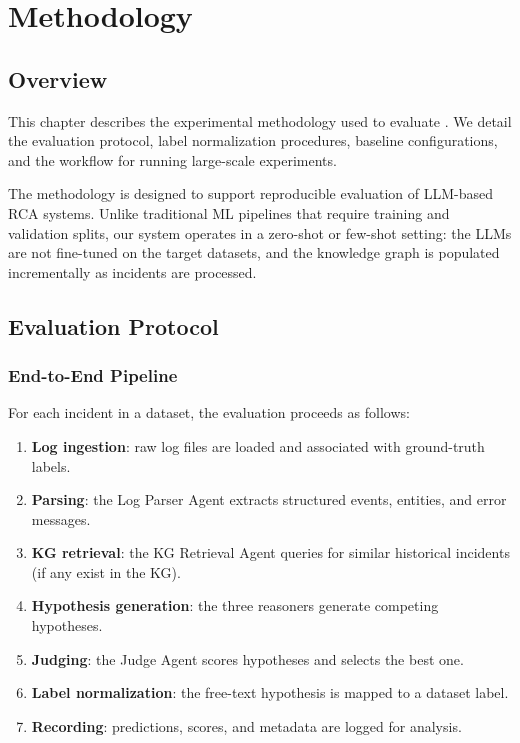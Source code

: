 
\chapter{Methodology}

\section{Overview}
This chapter describes the experimental methodology used to evaluate \systemname{}. We detail the
evaluation protocol, label normalization procedures, baseline configurations, and the workflow for
running large-scale experiments.

The methodology is designed to support reproducible evaluation of LLM-based RCA systems. Unlike
traditional ML pipelines that require training and validation splits, our system operates in a
zero-shot or few-shot setting: the LLMs are not fine-tuned on the target datasets, and the
knowledge graph is populated incrementally as incidents are processed.

\section{Evaluation Protocol}

\subsection{End-to-End Pipeline}
For each incident in a dataset, the evaluation proceeds as follows:
\begin{enumerate}
  \item \textbf{Log ingestion}: raw log files are loaded and associated with ground-truth labels.
  \item \textbf{Parsing}: the Log Parser Agent extracts structured events, entities, and error
        messages.
  \item \textbf{KG retrieval}: the KG Retrieval Agent queries for similar historical incidents
        (if any exist in the KG).
  \item \textbf{Hypothesis generation}: the three reasoners generate competing hypotheses.
  \item \textbf{Judging}: the Judge Agent scores hypotheses and selects the best one.
  \item \textbf{Label normalization}: the free-text hypothesis is mapped to a dataset label.
  \item \textbf{Recording}: predictions, scores, and metadata are logged for analysis.
\end{enumerate}

